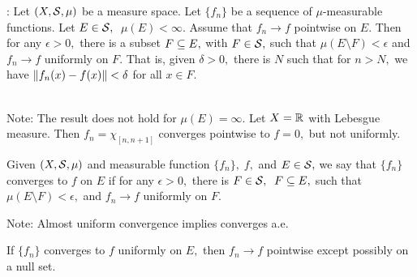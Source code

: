 \begin{frame*}
\noindent{}: Let $(X,\mathcal{S},\mu)$ be a measure space. Let $\{f_n\}$ be a sequence of $\mu$-measurable functions. Let $E\in\mathcal{S},\;$ $\mu(E)<\infty.$ Assume that $f_n\rightarrow f$ pointwise on $E.$ Then for any $\epsilon>0,$ there is a subset $F\subseteq E,$ with $F\in\mathcal{S},$ such that $\mu(E\setminus F)<\epsilon$ and $f_n\rightarrow f$ uniformly on $F.$ That is, given $\delta>0,$ there is $N$ such that for $n>N,$ we have $\left\lVert f_n(x)-f(x)\right\rVert<\delta$ for all $x\in F.$ \\ \\
\end{frame*}

\noindent Note: The result does not hold for $\mu(E)=\infty.$ Let $X=\mathbb{R}^{}$ with Lebesgue measure. Then $f_n=\chi_{[n,n+1]}$ converges pointwise to $f=0,$ but not uniformly.

\begin{defn}
Given $(X,\mathcal{S},\mu)$ and measurable function $\{f_n\},\; f,$ and $E\in\mathcal{S},$ we say that $\{f_n\}$ converges to $f$  on $E$ if for any $\epsilon>0,$ there is $F\in\mathcal{S},\;$ $F\subseteq E,$ such that $\mu(E\setminus F)<\epsilon,$ and $f_n\rightarrow f$ uniformly on $F.$
\end{defn}

\noindent Note: Almost uniform convergence implies converges a.e.

\begin{prop}
If $\{f_n\}$ converges to $f$ uniformly on $E,$ then $f_n\rightarrow f$ pointwise except possibly on a null set. \\ \\
\end{prop}

